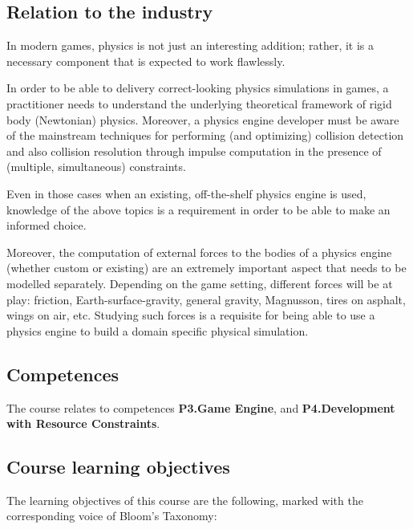 \documentclass{article}
\begin{document}
\subsection{Relation to the industry}
In modern games, physics is not just an interesting addition; rather, it is a necessary component that is expected to work flawlessly. 

In order to be able to delivery correct-looking physics simulations in games, a practitioner needs to understand the underlying theoretical framework of rigid body (Newtonian) physics. Moreover, a physics engine developer must be aware of the mainstream techniques for performing (and optimizing) collision detection and also collision resolution through impulse computation in the presence of (multiple, simultaneous) constraints. 

Even in those cases when an existing, off-the-shelf physics engine is used, knowledge of the above topics is a requirement in order to be able to make an informed choice.

Moreover, the computation of external forces to the bodies of a physics engine (whether custom or existing) are an extremely important aspect that needs to be modelled separately. Depending on the game setting, different forces will be at play: friction, Earth-surface-gravity, general gravity, Magnusson, tires on asphalt, wings on air, etc. Studying such forces is a requisite for being able to use a physics engine to build a domain specific physical simulation.


\subsection{Competences}
The course relates to competences \textbf{P3.Game Engine}, and \textbf{P4.Development with Resource Constraints}.


\subsection{Course learning objectives}
The learning objectives of this course are the following, marked with the corresponding voice of Bloom's Taxonomy:
\end{document}
